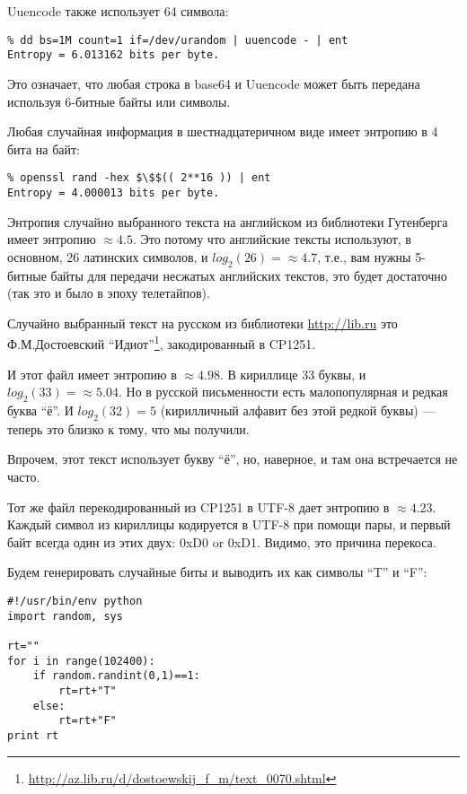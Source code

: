 Uuencode также использует 64 символа:

\begin{lstlisting}
% dd bs=1M count=1 if=/dev/urandom | uuencode - | ent
Entropy = 6.013162 bits per byte.
\end{lstlisting}

Это означает, что любая строка в base64 и Uuencode может быть передана используя 6-битные байты или символы.

Любая случайная информация в шестнадцатеричном виде имеет энтропию в 4 бита на байт:

\begin{lstlisting}
% openssl rand -hex $\$$(( 2**16 )) | ent
Entropy = 4.000013 bits per byte.
\end{lstlisting}

Энтропия случайно выбранного текста на английском из библиотеки Гутенберга имеет энтропию $\approx 4.5$.
Это потому что английские тексты используют, в основном, 26 латинских символов, и $log_2(26)=\approx 4.7$, т.е., вам
нужны 5-битные байты для передачи несжатых английских текстов, это будет достаточно (так это и было в эпоху телетайпов).

Случайно выбранный текст на русском из библиотеки \url{http://lib.ru}
это Ф.М.Достоевский ``Идиот''\footnote{\url{http://az.lib.ru/d/dostoewskij_f_m/text_0070.shtml}},
закодированный в CP1251.

И этот файл имеет энтропию в $\approx 4.98$.
В кириллице 33 буквы, и $log_2(33)=\approx 5.04$.
Но в русской письменности есть малопопулярная и редкая буква ``ё''.
И $log_2(32)=5$ (кирилличный алфавит без этой редкой буквы) --- теперь это близко к тому, что мы получили.

Впрочем, этот текст использует букву ``ё'', но, наверное, и там она встречается не часто.

Тот же файл перекодированный из CP1251 в UTF-8 дает энтропию в $\approx 4.23$.
Каждый символ из кириллицы кодируется в UTF-8 при помощи пары, и первый байт всегда один из этих двух: 0xD0 or 0xD1.
Видимо, это причина перекоса.

Будем генерировать случайные биты и выводить их как символы ``T'' и ``F'':

\begin{lstlisting}[style=custompy]
#!/usr/bin/env python
import random, sys

rt=""
for i in range(102400):
    if random.randint(0,1)==1:
        rt=rt+"T"
    else:
        rt=rt+"F"
print rt
\end{lstlisting}

